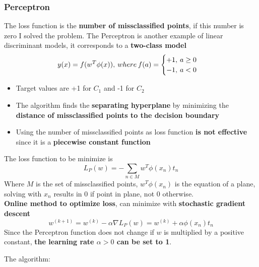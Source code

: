 \subsubsection{Perceptron}
    The loss function is the \textbf{number of missclassified points}, if this number is zero I solved the problem. The Perceptron is another example of linear discriminant models, it corresponds to a \textbf{two-class model}
    $$
    y(x)=f(w^T\phi(x)),\hspace{0.2em}where\hspace{0.2em}f(a)=
    \begin{cases}
        +1,\hspace{0.2em}a\geq 0\\
        -1,\hspace{0.2em}a<0
    \end{cases}
    $$
    \begin{itemize}
        \item Target values are +1 for $C_1$ and -1 for $C_2$
        \item The algorithm finds the \textbf{separating hyperplane} by minimizing the \textbf{distance of missclassified points to the decision boundary}
        \item Using the number of missclassified points as loss function \textbf{is not effective} since it is a \textbf{piecewise constant function}
    \end{itemize}
    The loss function to be minimize is
    $$L_P(w)=-\sum_{n\in M}w^T\phi(x_n)t_n$$
    Where $M$ is the set of missclassified points, $w^T\phi(x_n)$ is the equation of a plane, solving with $x_n$ results in 0 if point in plane, not 0 otherwise.\\
    \textbf{Online method to optimize loss}, can minimize with \textbf{stochastic gradient descent}
    $$w^{(k+1)}=w^{(k)}-\alpha\nabla L_P(w)=w^{(k)}+\alpha\phi(x_n)t_n$$
    Since the Perceptron function does not change if $w$ is multiplied by a positive constant, \textbf{the learning rate $\alpha>0$ can be set to 1}.
    
    The algorithm:

